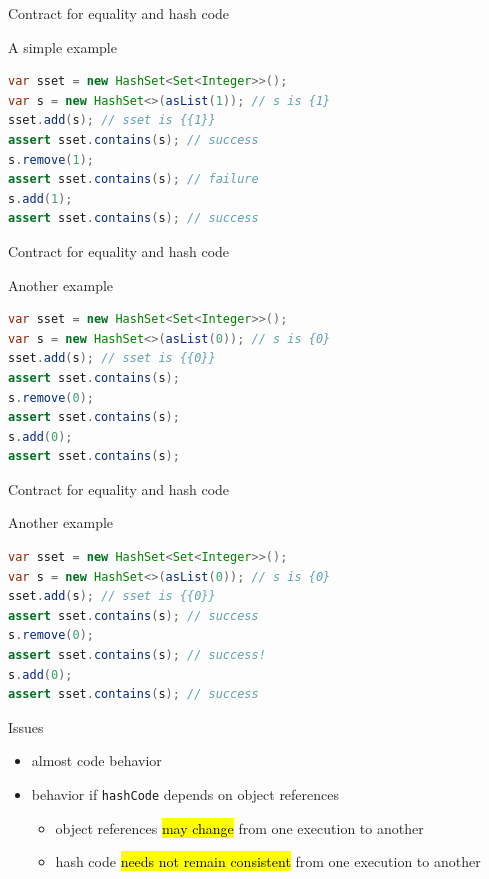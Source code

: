 \documentclass[10pt,usenames,dvipsnames]{beamer}
\begin{document}

\begin{frame}[fragile]{Contract for equality and hash code}
  \begin{block}{A simple example}
    \begin{lstlisting}[language=Java,basicstyle=\ttfamily\scriptsize]
var sset = new HashSet<Set<Integer>>();
var s = new HashSet<>(asList(1)); // s is {1}
sset.add(s); // sset is {{1}}
assert sset.contains(s); // success
s.remove(1);
assert sset.contains(s); // failure
s.add(1);
assert sset.contains(s); // success
    \end{lstlisting}
  \end{block}
\end{frame}


\begin{frame}[fragile]{Contract for equality and hash code}
  \begin{block}{Another example}
    \begin{lstlisting}[language=Java,basicstyle=\ttfamily\scriptsize]
var sset = new HashSet<Set<Integer>>();
var s = new HashSet<>(asList(0)); // s is {0}
sset.add(s); // sset is {{0}}
assert sset.contains(s); 
s.remove(0);
assert sset.contains(s); 
s.add(0);
assert sset.contains(s); 
    \end{lstlisting}
  \end{block}
\end{frame}


\begin{frame}[fragile]{Contract for equality and hash code}
  \begin{block}{Another example}
    \begin{lstlisting}[language=Java,basicstyle=\ttfamily\scriptsize]
var sset = new HashSet<Set<Integer>>();
var s = new HashSet<>(asList(0)); // s is {0}
sset.add(s); // sset is {{0}}
assert sset.contains(s); // success
s.remove(0);
assert sset.contains(s); // success!
s.add(0);
assert sset.contains(s); // success
    \end{lstlisting}
  \end{block}

  \begin{block}{Issues}
    \begin{itemize}
    \item almost  code behavior
    \item {} behavior if \lstinline[basicstyle=\ttfamily\normalsize]{hashCode} depends on object references
      \begin{itemize}
      \item object references \hl{may change} from one execution to another 
      \item hash code \hl{needs not remain consistent} from one execution to another 
      \end{itemize}    
    \end{itemize}    
  \end{block}
\end{frame}
\end{document}
